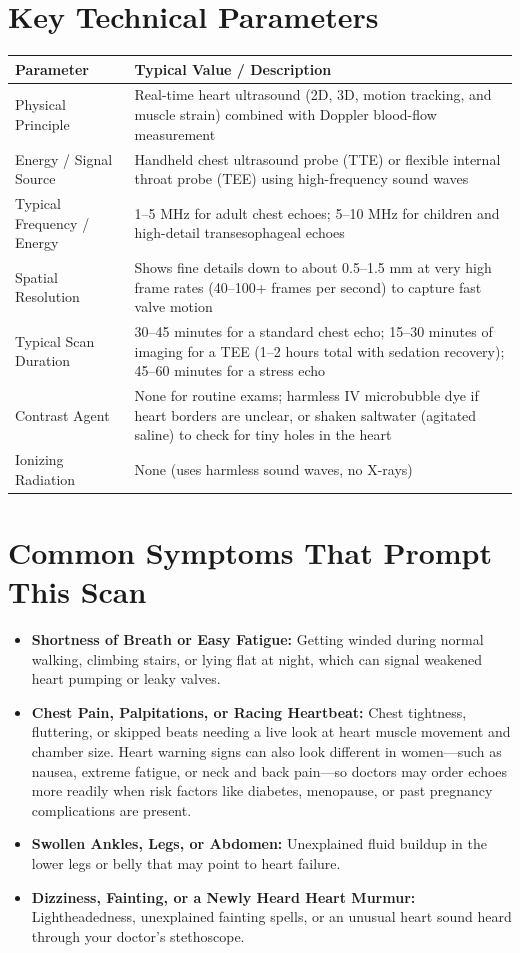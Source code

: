 \section{Key Technical Parameters}
\noindent
\begin{tabularx}{\textwidth}{@{}l X@{}}
\toprule
\textbf{Parameter} & \textbf{Typical Value / Description} \\
\midrule
Physical Principle & Real-time heart ultrasound (2D, 3D, motion tracking, and muscle strain) combined with Doppler blood-flow measurement \\
Energy / Signal Source & Handheld chest ultrasound probe (TTE) or flexible internal throat probe (TEE) using high-frequency sound waves \\
Typical Frequency / Energy & 1--5 MHz for adult chest echoes; 5--10 MHz for children and high-detail transesophageal echoes \\
Spatial Resolution & Shows fine details down to about 0.5--1.5 mm at very high frame rates (40--100+ frames per second) to capture fast valve motion \\
Typical Scan Duration & 30--45 minutes for a standard chest echo; 15--30 minutes of imaging for a TEE (1--2 hours total with sedation recovery); 45--60 minutes for a stress echo \\
Contrast Agent & None for routine exams; harmless IV microbubble dye if heart borders are unclear, or shaken saltwater (agitated saline) to check for tiny holes in the heart \\
Ionizing Radiation & None (uses harmless sound waves, no X-rays) \\
\bottomrule
\end{tabularx}

\section{Common Symptoms That Prompt This Scan}
\begin{itemize}
\item \textbf{Shortness of Breath or Easy Fatigue:} Getting winded during normal walking, climbing stairs, or lying flat at night, which can signal weakened heart pumping or leaky valves.
\item \textbf{Chest Pain, Palpitations, or Racing Heartbeat:} Chest tightness, fluttering, or skipped beats needing a live look at heart muscle movement and chamber size. Heart warning signs can also look different in women---such as nausea, extreme fatigue, or neck and back pain---so doctors may order echoes more readily when risk factors like diabetes, menopause, or past pregnancy complications are present.
\item \textbf{Swollen Ankles, Legs, or Abdomen:} Unexplained fluid buildup in the lower legs or belly that may point to heart failure.
\item \textbf{Dizziness, Fainting, or a Newly Heard Heart Murmur:} Lightheadedness, unexplained fainting spells, or an unusual heart sound heard through your doctor's stethoscope.
\end{itemize}

